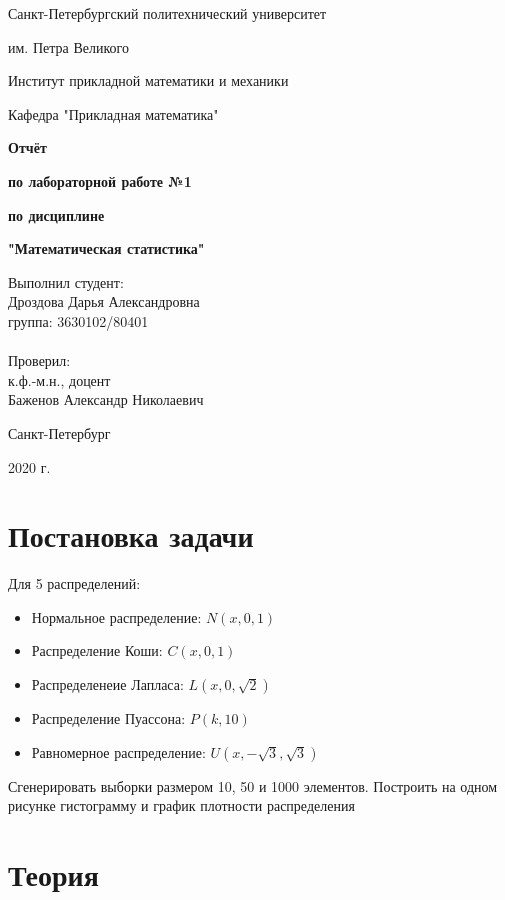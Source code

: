 \documentclass{article}
\begin{document}
\begin{titlepage}
  \thispagestyle{empty}
  \centerline {Санкт-Петербургский политехнический университет}
  \centerline { им. Петра Великого}
  \centerline { }
  \centerline {Институт прикладной математики и механики} 
  \centerline {Кафедра "Прикладная математика"}
  \vfill
  \centerline{\textbf{Отчёт}}
  \centerline{\textbf{по лабораторной работе №1}}
  \centerline{\textbf{по дисциплине}}
  \centerline{\textbf{"Математическая статистика"}}
  \vfill
  \hfill
  \begin{minipage}{0.45\textwidth}
  Выполнил студент:\\
  Дроздова Дарья Александровна\\
  группа: 3630102/80401 \\
  \\
  Проверил:\\
  к.ф.-м.н., доцент \\
  Баженов Александр Николаевич
  \end{minipage}
  \vfill
  \centerline {Санкт-Петербург}   
  \centerline {2020 г.}  
\end{titlepage}

\newpage
\setcounter{page}{2}
\tableofcontents

\newpage
\listoffigures

\newpage
\section{Постановка задачи}
  Для 5 распределений:
  \begin{itemize}
    \item Нормальное распределение: $N(x,0,1)$
    \item Распределение Коши: $C(x,0,1)$
    \item Распределенеие Лапласа: $L(x,0,\sqrt{2})$
    \item Распределение Пуассона: $P(k,10)$
    \item Равномерное распределение: $U(x,-\sqrt{3}, \sqrt{3})$
  \end{itemize}
  Сгенерировать выборки размером 10, 50 и 1000 элементов. Построить на одном рисунке гистограмму и график плотности распределения
  
\newpage
\section{Теория}
\end{document}
